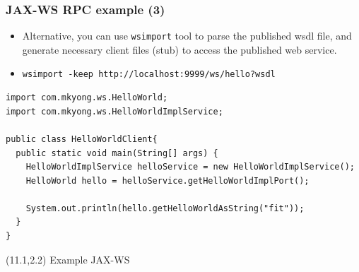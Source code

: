 \documentclass[10pt,xcolor=pdflatex]{beamer}
\begin{document}
\begin{frame}[containsverbatim]\frametitle{JAX-WS RPC example (3)}
\begin{footnotesize}
\begin{itemize}
  \item Alternative, you can use \texttt{wsimport} tool to parse the published wsdl file, and generate necessary client files (stub) to access the published web service.
  \item[] \verb+wsimport -keep http://localhost:9999/ws/hello?wsdl+
\end{itemize}
\begin{verbatim}
import com.mkyong.ws.HelloWorld;
import com.mkyong.ws.HelloWorldImplService;

public class HelloWorldClient{
  public static void main(String[] args) {
    HelloWorldImplService helloService = new HelloWorldImplService();
    HelloWorld hello = helloService.getHelloWorldImplPort();

    System.out.println(hello.getHelloWorldAsString("fit"));
  }
}
\end{verbatim}
\end{footnotesize}
\begin{textblock}{5}(11.1,2.2)
    {\footnotesize Example JAX-WS}
\end{textblock}
\end{frame}
\end{document}
